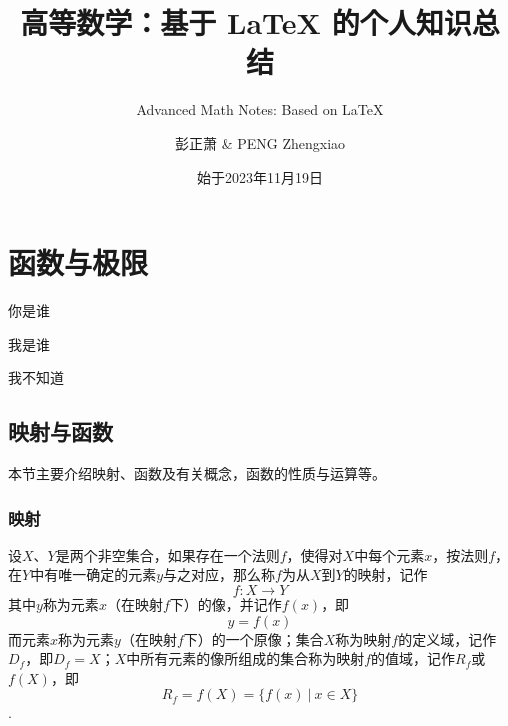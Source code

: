 \documentclass[lang=cn,10pt]{elegantbook}
\title{高等数学：基于 \LaTeX{} 的个人知识总结}
\subtitle{Advanced Math Notes: Based on \LaTeX{}}
\author{彭正萧 \& PENG Zhengxiao}
\institute{西北农林科技大学}
\date{始于2023年11月19日}
\begin{document}
\maketitle
\frontmatter
\tableofcontents
\mainmatter



\chapter{函数与极限}
\begin{introduction}
	\item 你是谁
	\item 我是谁
	\item 我不知道
\end{introduction}
\section{映射与函数}

本节主要介绍映射、函数及有关概念，函数的性质与运算等。

\subsection{映射}

\begin{definition}
	设\(X\)、\( Y \)是两个非空集合，如果存在一个法则\( f \)，使得对\( X \)中每个元素\( x \)，按法则\( f \)，在\( Y \)中有唯一确定的元素\( y \)与之对应，那么称\( f \)为从\( X \)到\( Y \)的映射，记作
	\[ f:X \rightarrow Y \]
	其中\( y \)称为元素\( x \)（在映射\( f \)下）的像，并记作\( f(x) \)，即
	\[ y = f(x) \]
	而元素\( x \)称为元素\( y \)（在映射\( f \)下）的一个原像；集合\( X \)称为映射\( f \)的定义域，记作\( D_{f} \)，即\( D_{f} = X \)；\( X \)中所有元素的像所组成的集合称为映射\( f \)的值域，记作\( R_{f} \)或\( f(X) \)，即
	\[ R_{f} = f(X) = \{ f(x)\ |\ x \in X\}\].
\end{definition}
\end{document}
